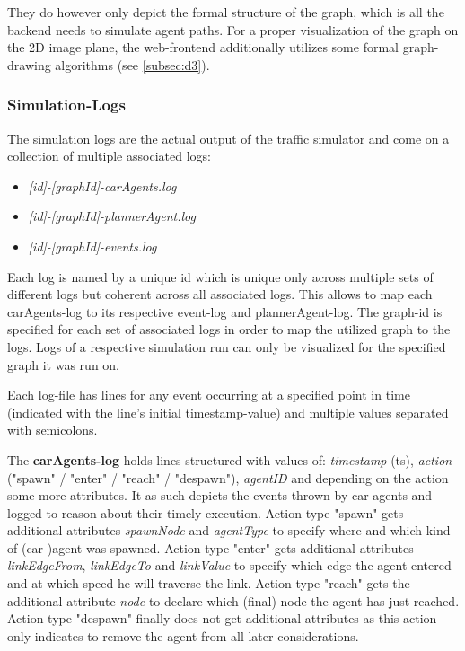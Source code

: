 They do however only depict the formal structure of the graph, which is all the backend needs to simulate agent paths. For a proper visualization of the graph on the 2D image plane, the web-frontend additionally utilizes some formal graph-drawing algorithms (see \autoref{subsec:d3}).

\subsubsection{Simulation-Logs}

The simulation logs are the actual output of the traffic simulator and come on a collection of multiple associated logs: 

\begin{itemize}
    \item \textit{[id]-[graphId]-carAgents.log}
    \item \textit{[id]-[graphId]-plannerAgent.log}
    \item \textit{[id]-[graphId]-events.log}
\end{itemize}

Each log is named by a unique id which is unique only across multiple sets of different logs but coherent across all associated logs. This allows to map each carAgents-log to its respective event-log and plannerAgent-log.
The graph-id is specified for each set of associated logs in order to map the utilized graph to the logs. Logs of a respective simulation run can only be visualized for the specified graph it was run on.

Each log-file has lines for any event occurring at a specified point in time (indicated with the line's initial timestamp-value) and multiple values separated with semicolons.

The \textbf{carAgents-log} holds lines structured with values of: \textit{timestamp} (ts), \textit{action} ("spawn" / "enter" / "reach" / "despawn"), \textit{agentID} and depending on the action some more attributes. It as such depicts the events thrown by car-agents and logged to reason about their timely execution.
Action-type "spawn" gets additional attributes \textit{spawnNode} and \textit{agentType} to specify where and which kind of (car-)agent was spawned. 
Action-type "enter" gets additional attributes \textit{linkEdgeFrom}, \textit{linkEdgeTo} and \textit{linkValue} to specify which edge the agent entered and at which speed he will traverse the link.
Action-type "reach" gets the additional attribute \textit{node} to declare which (final) node the agent has just reached.
Action-type "despawn" finally does not get additional attributes as this action only indicates to remove the agent from all later considerations.

